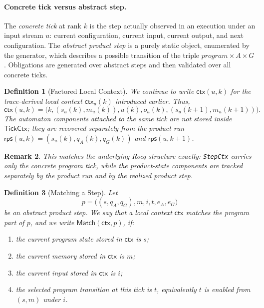 \documentclass[11pt,a4paper]{article}
\newtheorem{definition}{Definition}[section]
\newtheorem{remark}[definition]{Remark}
\newcommand{\TickCtx}{\mathsf{TickCtx}}
\newcommand{\Match}{\mathsf{Match}}
\newcommand{\rps}{\mathsf{rps}}
\newcommand{\ctx}{\mathsf{ctx}}
\begin{document}
\paragraph{Concrete tick versus abstract step.}
The \emph{concrete tick} at rank \(k\) is the step actually observed in an
execution under an input stream \(u\): current configuration, current input,
current output, and next configuration. The \emph{abstract product step} is a
purely static object, enumerated by the generator, which describes a possible
transition of the triple \(program \times A \times G\). Obligations are
generated over abstract steps and then validated over all concrete ticks.

\begin{definition}[Factored Local Context]
We continue to write \(\ctx(u,k)\) for the trace-derived local context
\(\ctx_u(k)\) introduced earlier. Thus,
\[
\ctx(u,k)=\bigl(k,(s_u(k),m_u(k)),u(k),o_u(k),(s_u(k+1),m_u(k+1))\bigr).
\]
The automaton components attached to the same tick are not stored inside
\(\TickCtx\); they are recovered separately from the product run
\(\rps(u,k)=(s_u(k),q_A(k),q_G(k))\) and \(\rps(u,k+1)\).
\end{definition}

\begin{remark}
This matches the underlying Rocq structure exactly: \texttt{StepCtx} carries
only the concrete program tick, while the product-state components are tracked
separately by the product run and by the realized product step.
\end{remark}

\begin{definition}[Matching a Step]
Let
\[
p = \bigl((s,q_A,q_G),m,i,t,e_A,e_G\bigr)
\]
be an abstract product step. We say that a local context \(\ctx\)
\emph{matches the program part of \(p\)}, and we write \(\Match(\ctx,p)\), if:
\begin{enumerate}[leftmargin=1.4em]
\item the current program state stored in \(\ctx\) is \(s\);
\item the current memory stored in \(\ctx\) is \(m\);
\item the current input stored in \(\ctx\) is \(i\);
\item the selected program transition at this tick is \(t\), equivalently
  \(t\) is enabled from \((s,m)\) under \(i\).
\end{enumerate}
\end{definition}
\end{document}
